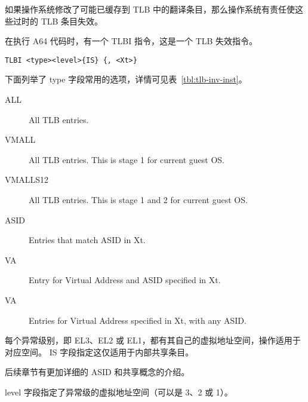 如果操作系统修改了可能已缓存到 TLB 中的翻译条目，那么操作系统有责任使这些过时的 TLB 条目失效。

在执行 A64 代码时，有一个 TLBI 指令，这是一个 TLB 失效指令。

\lstinline!TLBI <type><level>{IS} {, <Xt>}!

下面列举了 type 字段常用的选项，详情可见表~\ref{tbl:tlb-inv-inst}。

\begin{description}
  \item[ALL] All TLB entries.
  \item[VMALL] All TLB entries. This is stage 1 for current guest OS.
  \item[VMALLS12] All TLB entries. This is stage 1 and 2 for current guest OS.
  \item[ASID] Entries that match ASID in Xt.
  \item[VA] Entry for Virtual Address and ASID specified in Xt.
  \item[VA] Entries for Virtual Address specified in Xt, with any ASID.
\end{description}

每个异常级别，即 EL3、EL2 或 EL1，都有其自己的虚拟地址空间，操作适用于对应空间。
IS 字段指定这仅适用于内部共享条目。

\begin{Tcbox}[title={Note}]
  后续章节有更加详细的 ASID 和共享概念的介绍。
\end{Tcbox}

level 字段指定了异常级的虚拟地址空间（可以是 3、2 或 1）。

